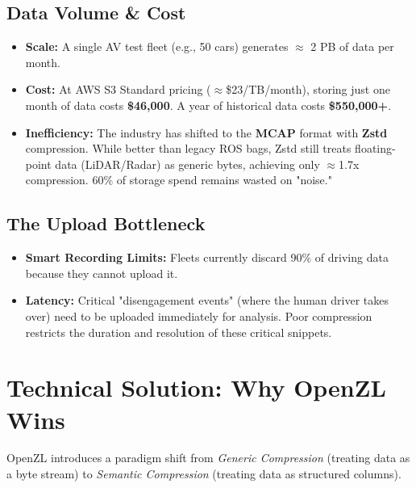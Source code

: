 \documentclass[11pt, letterpaper]{article}
\begin{document}
\subsection{Data Volume \& Cost}
\begin{itemize}
    \item \textbf{Scale:} A single AV test fleet (e.g., 50 cars) generates $\approx$ 2 PB of data per month.
    \item \textbf{Cost:} At AWS S3 Standard pricing ($\approx$\$23/TB/month), storing just one month of data costs \textbf{\$46,000}. A year of historical data costs \textbf{\$550,000+}.
    \item \textbf{Inefficiency:} The industry has shifted to the \textbf{MCAP} format with \textbf{Zstd} compression. While better than legacy ROS bags, Zstd still treats floating-point data (LiDAR/Radar) as generic bytes, achieving only $\approx$1.7x compression. 60\% of storage spend remains wasted on "noise."
\end{itemize}

\subsection{The Upload Bottleneck}
\begin{itemize}
    \item \textbf{Smart Recording Limits:} Fleets currently discard 90\% of driving data because they cannot upload it.
    \item \textbf{Latency:} Critical "disengagement events" (where the human driver takes over) need to be uploaded immediately for analysis. Poor compression restricts the duration and resolution of these critical snippets.
\end{itemize}

\section{Technical Solution: Why OpenZL Wins}
OpenZL introduces a paradigm shift from \textit{Generic Compression} (treating data as a byte stream) to \textit{Semantic Compression} (treating data as structured columns).
\end{document}
